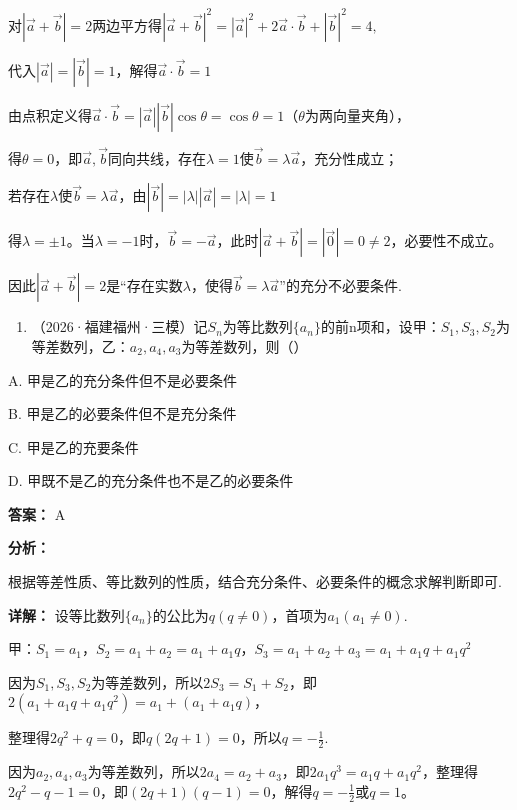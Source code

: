 \documentclass[11pt,a4paper]{ctexart}
\begin{document}
对\(|\vec{a} + \vec{b}| = 2\)两边平方得\(|\vec{a} + \vec{b}|^2 = |\vec{a}|^2 + 2\vec{a} \cdot \vec{b} + |\vec{b}|^2 = 4,\)

代入\(|\vec{a}| = |\vec{b}| = 1\)，解得\(\vec{a} \cdot \vec{b} = 1\)

由点积定义得\(\vec{a} \cdot \vec{b} = |\vec{a}||\vec{b}|\cos \theta = \cos \theta = 1\)（\(\theta\)为两向量夹角），

得\(\theta = 0\)，即\(\vec{a},\vec{b}\)同向共线，存在\(\lambda = 1\)使\(\vec{b} = \lambda \vec{a}\)，充分性成立；

若存在\(\lambda\)使\(\vec{b} = \lambda \vec{a}\)，由\(|\vec{b}| = |\lambda||\vec{a}| = |\lambda| = 1\)

得\(\lambda = \pm 1\)。当\(\lambda = -1\)时，\(\vec{b} = -\vec{a}\)，此时\(|\vec{a} + \vec{b}| = |\vec{0}| = 0 \neq 2\)，必要性不成立。

因此\(|\vec{a} + \vec{b}| = 2\)是``存在实数\(\lambda\)，使得\(\vec{b} = \lambda \vec{a}\)''的充分不必要条件.

\begin{enumerate}[label=\arabic*., leftmargin=*, start=5]
\item （2026·福建福州·三模）记\(S_{n}\)为等比数列\(\{a_{n}\}\)的前n项和，设甲：\(S_{1},S_{3},S_{2}\)为等差数列，乙：\(a_{2},a_{4},a_{3}\)为等差数列，则（）
\end{enumerate}

A. 甲是乙的充分条件但不是必要条件

B. 甲是乙的必要条件但不是充分条件

C. 甲是乙的充要条件

D. 甲既不是乙的充分条件也不是乙的必要条件

\textbf{答案：}
A

\textbf{分析：}

根据等差性质、等比数列的性质，结合充分条件、必要条件的概念求解判断即可.

\textbf{详解：}
设等比数列\(\{a_{n}\}\)的公比为\(q(q\neq0)\)，首项为\(a_{1}(a_{1}\neq0)\).

甲：\(S_{1} = a_{1}\)，\(S_{2} = a_{1} + a_{2} = a_{1} + a_{1}q\)，\(S_{3} = a_{1} + a_{2} + a_{3} = a_{1} + a_{1}q + a_{1}q^{2}\)

因为\(S_{1},S_{3},S_{2}\)为等差数列，所以\(2S_{3}=S_{1}+S_{2}\)，即\(2(a_{1}+a_{1}q+a_{1}q^{2})=a_{1}+(a_{1}+a_{1}q)\)，

整理得\(2q^{2}+q=0\)，即\(q(2q+1)=0\)，所以\(q=-\frac{1}{2}\).

因为\(a_{2}, a_{4}, a_{3}\)为等差数列，所以\(2a_{4} = a_{2} + a_{3}\)，即\(2a_{1}q^{3} = a_{1}q + a_{1}q^{2}\)，整理得\(2q^{2} - q - 1 = 0\)，即\((2q + 1)(q - 1) = 0\)，解得\(q = -\frac{1}{2}\)或\(q = 1\)。
\end{document}
